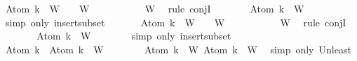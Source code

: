 \begin{isabellebody}
\ {\isachardoublequoteopen}Atom\ k\ {\isasymin}\ W\ {\isasymand}\ {\isacharbraceleft}{\isacharbraceright}\ {\isasymsubseteq}\ W{\isachardoublequoteclose}\isanewline
\ \ \ \ \ \ \isamarkupfalse%
\ {}\ {\isacartoucheopen}{\isacharbraceleft}{\isacharbraceright}\ {\isasymsubseteq}\ W{\isacartoucheclose}\ \isamarkupfalse%
\ {\isacharparenleft}rule\ conjI{\isacharparenright}\isanewline
\ \ \ \ \isamarkupfalse%
\ \isamarkupfalse%
\ {\isachardoublequoteopen}{\isacharbraceleft}Atom\ k{\isacharbraceright}\ {\isasymsubseteq}\ W{\isachardoublequoteclose}\isanewline
\ \ \ \ \ \ \isamarkupfalse%
\ {\isacharparenleft}simp\ only{\isacharcolon}\ insert{\isacharunderscore}subset{\isacharparenright}\isanewline
\ \ \ \ \isamarkupfalse%
\ {\isachardoublequoteopen}\isactrlbold {\isasymnot}\ {\isacharparenleft}Atom\ k{\isacharparenright}\ {\isasymin}\ W\ {\isasymand}\ {\isacharbraceleft}{\isacharbraceright}\ {\isasymsubseteq}\ W{\isachardoublequoteclose}\isanewline
\ \ \ \ \ \ \isamarkupfalse%
\ {}\ {\isacartoucheopen}{\isacharbraceleft}{\isacharbraceright}\ {\isasymsubseteq}\ W{\isacartoucheclose}\ \isamarkupfalse%
\ {\isacharparenleft}rule\ conjI{\isacharparenright}\isanewline
\ \ \ \ \isamarkupfalse%
\ \isamarkupfalse%
\ {\isachardoublequoteopen}{\isacharbraceleft}\isactrlbold {\isasymnot}{\isacharparenleft}Atom\ k{\isacharparenright}{\isacharbraceright}\ {\isasymsubseteq}\ W{\isachardoublequoteclose}\isanewline
\ \ \ \ \ \ \isamarkupfalse%
\ {\isacharparenleft}simp\ only{\isacharcolon}\ insert{\isacharunderscore}subset{\isacharparenright}\isanewline
\ \ \ \ \isamarkupfalse%
\ {\isachardoublequoteopen}{\isacharbraceleft}Atom\ k{\isacharbraceright}\ {\isasymunion}\ {\isacharbraceleft}\isactrlbold {\isasymnot}{\isacharparenleft}Atom\ k{\isacharparenright}{\isacharbraceright}\ {\isasymsubseteq}\ W{\isachardoublequoteclose}\isanewline
\ \ \ \ \ \ \isamarkupfalse%
\ {\isacartoucheopen}{\isacharbraceleft}Atom\ k{\isacharbraceright}\ {\isasymsubseteq}\ W{\isacartoucheclose}\ {\isacartoucheopen}{\isacharbraceleft}\isactrlbold {\isasymnot}{\isacharparenleft}Atom\ k{\isacharparenright}{\isacharbraceright}\ {\isasymsubseteq}\ W{\isacartoucheclose}\ \isamarkupfalse%
\ {\isacharparenleft}simp\ only{\isacharcolon}\ Un{\isacharunderscore}least{\isacharparenright}\isanewline
\ \ \ \ \isamarkupfalse%
\ \isamarkupfalse%

\end{isabellebody}
